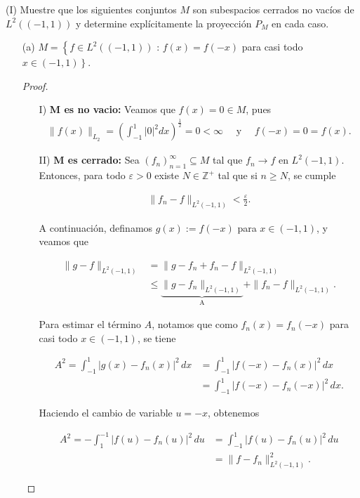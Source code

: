  (I) Muestre que los siguientes conjuntos $M$ son subespacios cerrados no vacíos de $L^2((-1,1))$ y determine explícitamente la proyección $P_M$ en cada caso.
 \begin{itemize}

     

\item[(a)] $M=\left\{f \in L^2((-1,1))\right.$ : $f(x)=f(-x)$ para casi todo $\left.x \in(-1,1)\right\}$.
\begin{proof}
\hfill
\begin{enumerate}
    \item[I)] \textbf{M es no vacio:} 
    Veamos que $f(x)=0\in M$, pues 
    \begin{align*}
        \|f(x)\|_{L_2}=\left( \int_{-1}^{1}|0|^2 dx\right)^{\frac{1}{2}}=0<\infty\quad \text{ y }\quad f(-x)=0=f(x).
    \end{align*}
    \item[II)]\textbf{M es cerrado:} Sea \( (f_n)_{n=1}^{\infty} \subseteq M \) tal que \( f_n \to f \) en \( L^2(-1,1) \). Entonces, para todo \( \varepsilon > 0 \) existe \( N \in \mathbb{Z}^+ \) tal que si \( n \geq N \), se cumple

\begin{align}
    \|f_n - f\|_{L^2(-1,1)} < \frac{\varepsilon}{2}. \label{eq:convergencia}
\end{align}

A continuación, definamos \( g(x) := f(-x) \) para \( x \in (-1,1) \), y veamos que

\begin{align}
    \|g - f\|_{L^2(-1,1)} &= \|g - f_n + f_n - f\|_{L^2(-1,1)} \nonumber \\
    &\leq \underbrace{\|g - f_n\|_{L^2(-1,1)}}_{\text{A}} + \|f_n - f\|_{L^2(-1,1)}. \label{eq:desigualdad}
\end{align}

Para estimar el término \( A \), notamos que como \( f_n(x) = f_n(-x) \) para casi todo \( x \in (-1,1) \), se tiene

\begin{align*}
    A^2 = \int_{-1}^1 |g(x) - f_n(x)|^2\,dx &= \int_{-1}^1 |f(-x) - f_n(x)|^2\,dx \\
    &= \int_{-1}^1 |f(-x) - f_n(-x)|^2\,dx.
\end{align*}

Haciendo el cambio de variable \( u = -x \), obtenemos

\begin{align}
    A^2 = -\int_{1}^{-1} |f(u) - f_n(u)|^2\,du &= \int_{-1}^{1} |f(u) - f_n(u)|^2\,du \nonumber \\
    &= \|f - f_n\|_{L^2(-1,1)}^2. \label{eq:romano}
\end{align}


\end{enumerate}
\end{proof}
\end{itemize}
